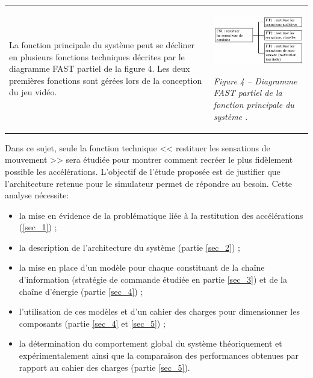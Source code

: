 \documentclass[10pt,fleqn]{article} %
\begin{document}
\begin{center}
\begin{tabular}{p{.45\linewidth}p{.45\linewidth}}
La fonction principale du système peut se décliner en plusieurs fonctions techniques décrites par le diagramme FAST partiel de la figure 4. Les deux premières fonctions sont gérées lors de la conception du jeu vidéo. 
 
& 
\begin{center}
\includegraphics[width=.9\linewidth]{images/fig_04}

\textit{Figure 4 -- Diagramme FAST partiel de la fonction principale du système .}
\end{center}
\end{tabular}



\end{center}

\begin{obj}
Dans ce sujet, seule la fonction technique  << restituer les sensations de mouvement >> sera étudiée pour montrer comment recréer le plus fidèlement possible les accélérations. 
L'objectif de l'étude proposée est de justifier que l'architecture retenue pour le simulateur permet de répondre au besoin. Cette analyse nécessite:
\begin{itemize} 
\item la mise en évidence de la problématique liée à la restitution des accélérations (\ref{sec_1}) ; 
\item la description de l'architecture du système (partie \ref{sec_2}) ; 
\item la mise en place d'un modèle pour chaque constituant de la chaîne d'information (stratégie 
de commande étudiée en partie \ref{sec_3}) et de la chaîne d'énergie (partie \ref{sec_4}) ; 
\item l'utilisation de ces modèles et d'un cahier des charges pour dimensionner les composants (partie \ref{sec_4} et \ref{sec_5}) ; 
\item la détermination du comportement global du système théoriquement et expérimentalement ainsi que la comparaison des performances obtenues par rapport au cahier des charges (partie \ref{sec_5}). 
\end{itemize}
\end{obj}
\end{document}
